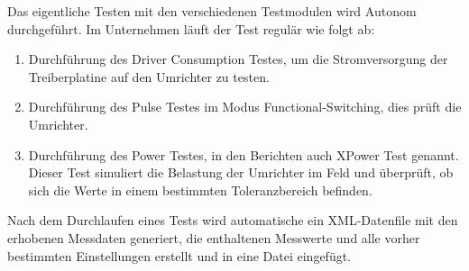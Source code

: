 Das eigentliche Testen mit den verschiedenen Testmodulen wird Autonom durchgeführt.
Im Unternehmen läuft der Test regulär wie folgt ab:
\begin{enumerate}

\item Durchführung des Driver Consumption Testes, um die Stromversorgung der Treiberplatine auf den Umrichter zu testen.
\item Durchführung des Pulse Testes im Modus Functional-Switching, dies prüft die Umrichter.
\item Durchführung des Power Testes, in den Berichten auch XPower Test genannt.
Dieser Test simuliert die Belastung der Umrichter im Feld und überprüft,
ob sich die Werte in einem bestimmten Toleranzbereich befinden.

\end{enumerate}

Nach dem Durchlaufen eines Tests wird automatische ein XML-Datenfile mit den erhobenen Messdaten generiert,
die enthaltenen Messwerte und alle vorher bestimmten Einstellungen erstellt und in eine Datei eingefügt.



